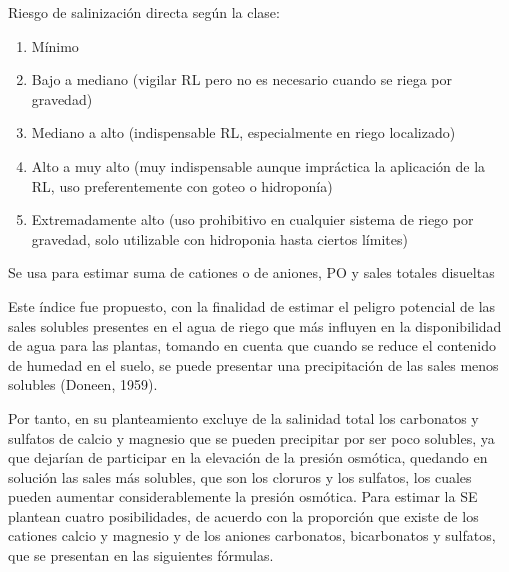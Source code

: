 Riesgo de salinización directa según la clase:
\begin{enumerate}
  \item Mínimo
  \item Bajo a mediano (vigilar RL pero no es necesario cuando se riega por gravedad)
  \item Mediano a alto (indispensable RL, especialmente en riego localizado)
  \item Alto a muy alto (muy indispensable aunque impráctica la aplicación de la RL, uso preferentemente con goteo o hidroponía)
  \item Extremadamente alto (uso prohibitivo en cualquier sistema de riego por gravedad, solo utilizable con hidroponia hasta ciertos límites)
\end{enumerate}
Se usa para estimar suma de cationes o de aniones, PO y sales totales disueltas

Este índice fue propuesto, con la finalidad de estimar el peligro potencial de las sales solubles presentes en el agua de riego que más influyen en la disponibilidad de agua para las plantas, tomando en cuenta que cuando se reduce el contenido de humedad en el suelo, se puede presentar una precipitación de las sales menos solubles (Doneen, 1959).

Por tanto, en su planteamiento excluye de la salinidad total los carbonatos y sulfatos de calcio y magnesio que se pueden precipitar por ser poco solubles, ya que dejarían de participar en la elevación de la presión osmótica, quedando en solución las sales más solubles, que son los cloruros y los sulfatos, los cuales pueden aumentar considerablemente la presión osmótica. Para estimar la SE plantean cuatro posibilidades, de acuerdo con la proporción que existe de los cationes calcio y magnesio y de los aniones carbonatos, bicarbonatos y sulfatos, que se presentan en las siguientes fórmulas.

